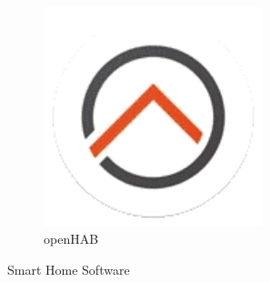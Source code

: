 \begin{figure}[h!tb]
\begin{subfigure}[b]{0.3\linewidth}
 		\includegraphics[width=0.7\textwidth]{img/openhab_logo.png}
 		\caption[openHAB Logo]{openHAB}
 		\label{fig:openhab-logo}
 	\end{subfigure}
 	\caption[Beispiele für Smart Home Software]{Smart Home Software}
 	\label{fig:software-logos}
\end{figure}